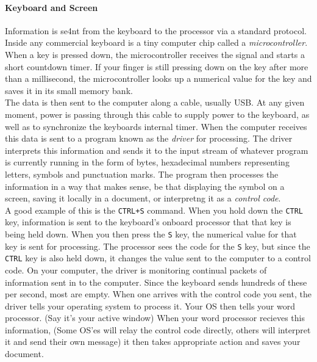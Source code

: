 \documentclass[english]{article}
\begin{document}
\paragraph{Keyboard and Screen}
Information is se4nt from the keyboard to the processor via a standard protocol. Inside any commercial keyboard is a tiny computer chip
called a {\it microcontroller}. When a key is pressed down, the microcontroller receives the signal and starts a short countdown timer. If your finger is still pressing down on the key after more than a millisecond, the microcontroller looks up a numerical value for the key
and saves it in its small memory bank.
\break
\\The data is then sent to the computer along a cable, usually USB. At any given moment, power
is passing through this cable to supply power to the keyboard, as well as to synchronize the keyboards internal timer. When the
computer receives this data is sent to a program known as the {\it driver} for processing. The driver interprets this information
and sends it to the input stream of whatever program is currently running in the form of bytes, hexadecimal numbers representing
letters, symbols and punctuation marks. The program then processes the information in a way that makes sense, be that displaying
the symbol on a screen, saving it locally in a document, or interpretng it as a {\it control code}.
\break
\\A good example of this is the \texttt{CTRL+S} command. When you hold down the \texttt{CTRL} key, information is sent to the keyboard's onboard processor that that key is being held down. When you then press the \texttt{S} key, the numerical value for that key is sent for processing. The processor sees the code for the \texttt{S} key, but since the \texttt{CTRL} key is also held down, it changes the value sent to the computer to a control code. On your computer, the driver is monitoring continual packets of information sent in to the computer. Since the keyboard sends hundreds of these per second, most are empty. When one arrives with the control code you sent, the driver tells your operating system to process it. Your OS then tells your word processor. (Say it's your active window) When your word processor recieves this information, (Some OS'es will relay the control code directly, others will interpret it and send their own message) it then takes appropriate action and saves your document.
\break
\end{document}
